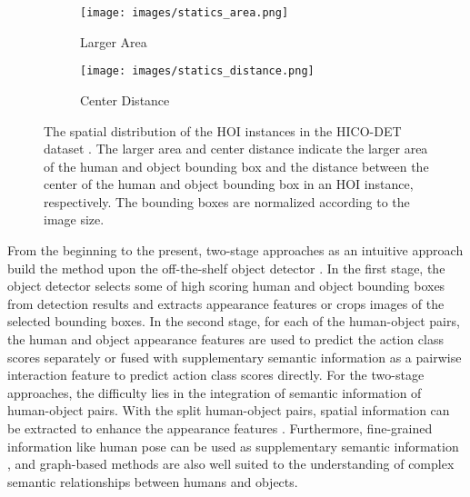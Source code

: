 \documentclass[10pt,twocolumn,letterpaper]{article}
\begin{document}
\begin{figure}
  \centering
  \begin{subfigure}{0.49\linewidth}
    \centering
    \texttt{[image: images/statics\_area.png]}
    \caption{Larger Area}
    \label{fig:f1-a}
  \end{subfigure}
  \begin{subfigure}{0.49\linewidth}
    \centering
    \texttt{[image: images/statics\_distance.png]}
    \caption{Center Distance}
    \label{fig:f1-b}
  \end{subfigure}
  \caption{The spatial distribution of the HOI instances in the HICO-DET dataset \cite{chao2018learning}. 
  The larger area and center distance indicate the larger area of the human and object bounding box and the distance between the center of the human and object bounding box in an HOI instance, respectively.
  The bounding boxes are normalized according to the image size.}
  \label{fig:HICO-DET-distribution}
\end{figure}
From the beginning to the present, two-stage approaches
\cite{chao2018learning,qi2018learning,gao2018ican,li2019transferable,zhou2019relation,bansal2020detecting,wan2019pose,
   ulutan2020vsgnet,hou2020visual,gao2020drg,zhang2020spatio,zhong2021polysemy,gupta2019no}
as an intuitive approach build the method upon the off-the-shelf object detector \cite{ren2016faster}.
In the first stage, the object detector selects some of high scoring human and object bounding boxes from detection results and extracts appearance features or crops images of the selected bounding boxes.
In the second stage, for each of the human-object pairs, the human and object appearance features are used to predict the action class scores separately or fused with supplementary semantic information as a pairwise interaction feature to predict action class scores directly.
For the two-stage approaches, the difficulty lies in the integration of semantic information of human-object pairs. With the split human-object pairs, spatial information can be extracted to enhance the appearance features
\cite{chao2018learning,gao2018ican,li2019transferable,bansal2020detecting,wan2019pose,ulutan2020vsgnet,
   hou2020visual,gao2020drg,zhang2020spatio,zhong2021polysemy,gupta2019no}.
Furthermore, fine-grained information like human pose can be used as supplementary semantic information \cite{li2019transferable,zhou2019relation,wan2019pose,zhong2021polysemy,gupta2019no}, and graph-based methods \cite{qi2018learning,zhou2019relation,ulutan2020vsgnet,gao2020drg,zhang2020spatio} are also well suited to the understanding of complex semantic relationships between humans and objects.
\end{document}
